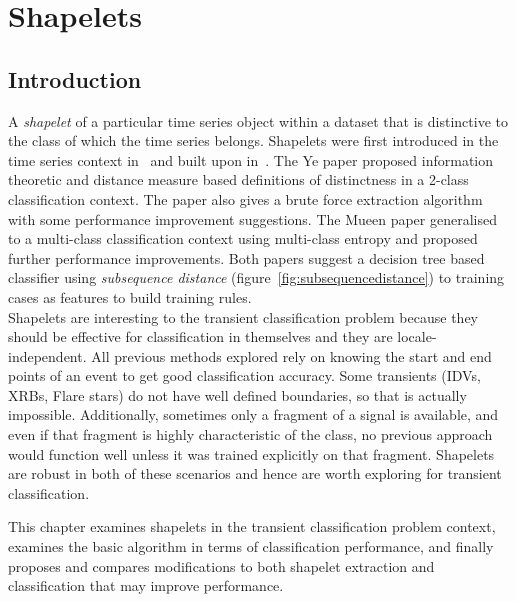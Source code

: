 \chapter{Shapelets}
\section{Introduction}
\label{sec:shapelets}
A \emph{shapelet} of a particular time series object within a dataset that is distinctive to the class of which the time series belongs. Shapelets were first introduced in the time series context in~\citet{ye2009time} and built upon in~\citet{mueen2011logical}. The Ye paper proposed information theoretic and distance measure based definitions of distinctness in a 2-class classification context. The paper also gives a brute force extraction algorithm with some performance improvement suggestions. The Mueen paper generalised to a multi-class classification context using multi-class entropy and proposed further performance improvements. Both papers suggest a decision tree based classifier using \emph{subsequence distance} (figure~\ref{fig:subsequencedistance}) to training cases as features to build training rules. \\

Shapelets are interesting to the transient classification problem because they should be effective for classification in themselves and they are locale-independent. All previous methods explored rely on knowing the start and end points of an event to get good classification accuracy. Some transients (IDVs, XRBs, Flare stars) do not have well defined boundaries, so that is actually impossible. Additionally, sometimes only a fragment of a signal is available, and even if that fragment is highly characteristic of the class, no previous approach would function well unless it was trained explicitly on that fragment. Shapelets are robust in both of these scenarios and hence are worth exploring for transient classification.

This chapter examines shapelets in the transient classification problem context, examines the basic algorithm in terms of classification performance, and finally proposes and compares modifications to both shapelet extraction and classification that may improve performance.


